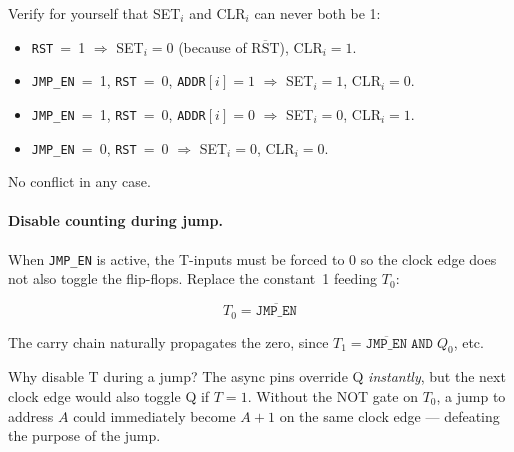 \documentclass[11pt,a4paper]{article}
\newcommand{\signal}[1]{\texttt{#1}}
\begin{document}
\begin{designnote}
Verify for yourself that SET$_i$ and CLR$_i$ can never both be 1:
\begin{itemize}[nosep]
  \item \signal{RST}~=~1 $\Rightarrow$ SET$_i = 0$ (because of $\overline{\text{RST}}$),
        CLR$_i = 1$. \checkmark
  \item \signal{JMP\_EN}~=~1, \signal{RST}~=~0, \signal{ADDR}$[i]=1$
        $\Rightarrow$ SET$_i = 1$, CLR$_i = 0$. \checkmark
  \item \signal{JMP\_EN}~=~1, \signal{RST}~=~0, \signal{ADDR}$[i]=0$
        $\Rightarrow$ SET$_i = 0$, CLR$_i = 1$. \checkmark
  \item \signal{JMP\_EN}~=~0, \signal{RST}~=~0
        $\Rightarrow$ SET$_i = 0$, CLR$_i = 0$. \checkmark
\end{itemize}
No conflict in any case.
\end{designnote}

\paragraph{Disable counting during jump.}
When \signal{JMP\_EN} is active, the T-inputs must be forced to 0 so the
clock edge does not also toggle the flip-flops.
Replace the constant~1 feeding $T_0$:

\[
  T_0 = \overline{\signal{JMP\_EN}}
\]

The carry chain naturally propagates the zero, since
$T_1 = \overline{\signal{JMP\_EN}} \;\texttt{AND}\; Q_0$, etc.

\begin{designnote}
Why disable T during a jump? The async pins override Q \emph{instantly}, but
the next clock edge would also toggle Q if $T = 1$.
Without the NOT gate on $T_0$, a jump to address $A$ could immediately
become $A+1$ on the same clock edge --- defeating the purpose of the jump.
\end{designnote}
\end{document}
